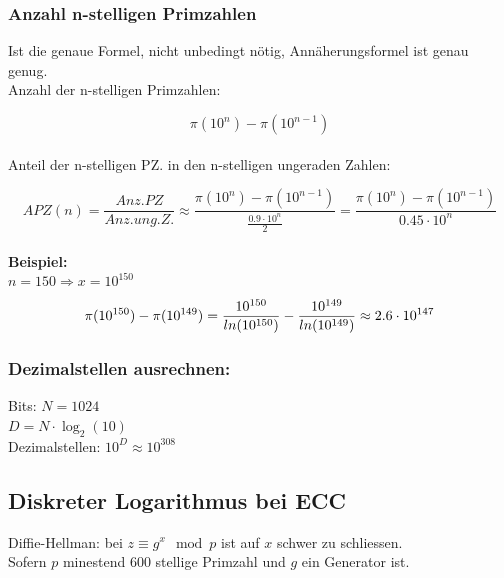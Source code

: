 \documentclass[12pt]{scrartcl}
\begin{document}
\subsubsection{Anzahl n-stelligen Primzahlen}

Ist die genaue Formel, nicht unbedingt nötig, Annäherungsformel ist genau genug.\\

Anzahl der n-stelligen Primzahlen:

\[ \pi(10^n) - \pi(10^{n-1})  \] \\

Anteil der n-stelligen PZ. in den n-stelligen ungeraden Zahlen:

\begin{equation*}
    APZ(n) = \frac{Anz. PZ}{Anz.ung.Z.} \approx \frac{\pi(10^n) - \pi(10^{n-1})}{\displaystyle{\frac{0.9 \cdot 10^n}{2}}} = \frac{\pi(10^n) - \pi(10^{n-1})}{0.45 \cdot 10^n}
\end{equation*} \\


\textbf{Beispiel:} \\
$n = 150 \Rightarrow x = 10^{150}$ \\

\begin{equation*}
    \pi(10^{150}) - \pi(10^{149}) = \frac{10^{150}}{ln(10^{150})} - \frac{10^{149}}{ln(10^{149})} \approx 2.6 \cdot 10^{147} \\
\end{equation*}


\subsubsection{Dezimalstellen ausrechnen:}

Bits: $N = 1024$\\
$D = N \cdot \log_2(10)$\\
Dezimalstellen: $10^{D} \approx 10^{308}$\\



\newpage 
\subsection{Diskreter Logarithmus bei ECC}

Diffie-Hellman: bei $z \equiv g^x \mod p$ ist auf $x$ schwer zu schliessen.\\
Sofern $p$ minestend 600 stellige Primzahl und $g$ ein Generator ist.\\
\end{document}
